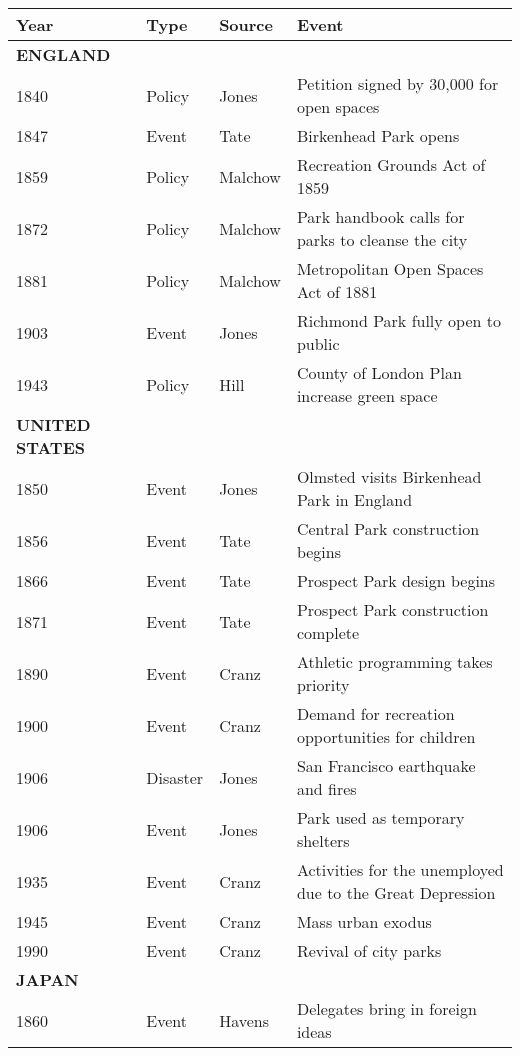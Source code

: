 \begin{table}[htbp]
\small
\begin{adjustwidth}{-1in}{-1in} %
\centering
\begin{tabular}{llll}
\toprule
Year &      Type &   Source & Event \\
\midrule
\textbf{ENGLAND} & {} & {} & {}\\
1840 &    Policy &    Jones & Petition signed by 30,000 for open spaces \\
1847 &     Event &     Tate & Birkenhead Park opens  \\
1859 &    Policy &  Malchow & Recreation Grounds Act of 1859 \\
1872 &    Policy &  Malchow & Park handbook calls for parks to cleanse the city \\
1881 &    Policy &  Malchow & Metropolitan Open Spaces Act of 1881 \\
1903 &     Event &    Jones & Richmond Park fully open to public \\
1943 &    Policy &     Hill & County of London Plan increase green space \\
\midrule
\textbf{UNITED STATES} & {} & {} & {}\\
1850 &     Event &    Jones & Olmsted visits Birkenhead Park in England \\
1856 &     Event &     Tate & Central Park construction begins \\
1866 &     Event &     Tate & Prospect Park design begins \\
1871 &     Event &     Tate & Prospect Park construction complete \\
1890 &     Event &    Cranz & Athletic programming takes priority \\
1900 &     Event &    Cranz & Demand for recreation opportunities for children \\
1906 &  Disaster &    Jones & San Francisco earthquake and fires \\
1906 &     Event &    Jones & Park used as temporary shelters \\
1935 &     Event &    Cranz & Activities for the unemployed due to the Great Depression \\
1945 &     Event &    Cranz & Mass urban exodus \\
1990 &     Event &    Cranz & Revival of city parks \\
\midrule
\textbf{JAPAN} & {} & {} & {}\\
1860 &     Event &   Havens & Delegates bring in foreign ideas \\

\end{tabular}
\end{adjustwidth}
\end{table}
